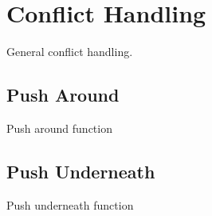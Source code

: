 \section{Conflict Handling}
General conflict handling.

\subsection{Push Around}
Push around function

\subsection{Push Underneath}
Push underneath function

